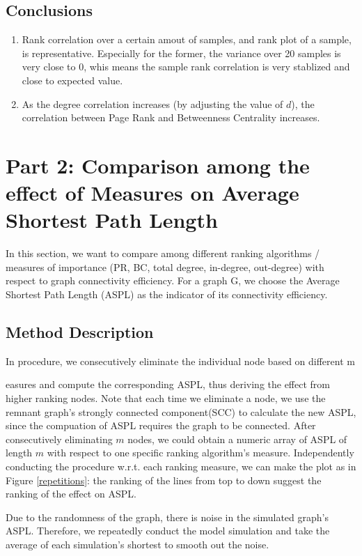 \documentclass{article}
\begin{document}
\subsection{Conclusions}
\begin{enumerate}
\item Rank correlation over a certain amout of samples, and rank plot of a sample, is representative. Especially for the former, the variance over 20 samples is very close to 0, whis means the sample rank correlation is very stablized and close to expected value.
\item As the degree correlation increases (by adjusting the value of $d$), the correlation between Page Rank and Betweenness Centrality increases.
\end{enumerate}

\section{Part 2:  Comparison among the effect of Measures on Average Shortest Path Length}
\par In this section,  we want to compare among different ranking algorithms / measures of importance (PR, BC, total degree, in-degree, out-degree) with respect to graph connectivity efficiency. For a graph G, we choose the Average Shortest Path Length (ASPL) as the indicator of its connectivity efficiency. 

\subsection{Method Description}
\par In procedure, we consecutively eliminate the individual node based on different m\par easures and compute the corresponding ASPL, thus deriving the effect from higher ranking nodes. Note that each time we eliminate a node, we use the remnant graph's strongly connected component(SCC) to calculate the new ASPL, since the compuation of ASPL requires the graph to be connected. After consecutively eliminating $m$ nodes, we could obtain a numeric array of ASPL of length $m$ with respect to one specific ranking algorithm's measure. Independently conducting the procedure w.r.t. each ranking measure,  we can make the plot as in Figure \ref{repetitions}: the ranking of the lines from top to down suggest the ranking of the effect on ASPL. 
\par Due to the randomness of the graph, there is noise in the simulated graph's ASPL. Therefore, we repeatedly conduct the model simulation and take the average of each simulation's shortest to smooth out the noise.
\end{document}
